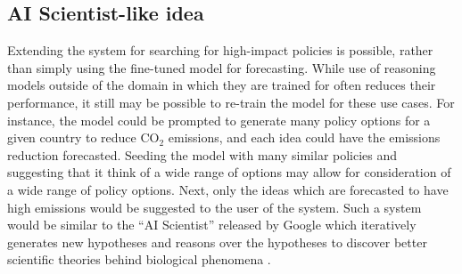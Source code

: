 \documentclass[12pt,a4paper]{article}
\begin{document}
\subsection{AI Scientist-like idea}
Extending the system for searching for high-impact policies is possible, rather than simply using the fine-tuned model for forecasting. While use of reasoning models outside of the domain in which they are trained for often reduces their performance, it still may be possible to re-train the model for these use cases. For instance, the model could be prompted to generate many policy options for a given country to reduce CO$_2$ emissions, and each idea could have the emissions reduction forecasted. Seeding the model with many similar policies and suggesting that it think of a wide range of options may allow for consideration of a wide range of policy options. Next, only the ideas which are forecasted to have high emissions would be suggested to the user of the system. Such a system would be similar to the ``AI Scientist'' released by Google which iteratively generates new hypotheses and reasons over the hypotheses to discover better scientific theories behind biological phenomena .
\end{document}
